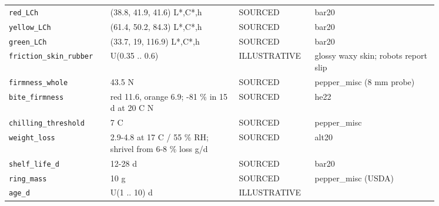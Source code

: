 \documentclass[10.5pt,a4paper]{article}
\begin{document}
{\begin{longtable}{@{}p{0.2\linewidth}p{0.27\linewidth}p{0.12\linewidth}p{0.26\linewidth}@{}}
\texttt{red\_\allowbreak{}LCh} & (38.8, 41.9, 41.6) L*,C*,h & SOURCED & bar20 \\
\texttt{yellow\_\allowbreak{}LCh} & (61.4, 50.2, 84.3) L*,C*,h & SOURCED & bar20 \\
\texttt{green\_\allowbreak{}LCh} & (33.7, 19, 116.9) L*,C*,h & SOURCED & bar20 \\
\texttt{friction\_\allowbreak{}skin\_\allowbreak{}rubber} & U(0.35 .. 0.6) & ILLUSTRATIVE & glossy waxy skin; robots report slip \\
\texttt{firmness\_\allowbreak{}whole} & 43.5 N & SOURCED & pepper\_misc (8 mm probe) \\
\texttt{bite\_\allowbreak{}firmness} & red 11.6, orange 6.9; -81 \% in 15 d at 20 C N & SOURCED & he22 \\
\texttt{chilling\_\allowbreak{}threshold} & 7 C & SOURCED & pepper\_misc \\
\texttt{weight\_\allowbreak{}loss} & 2.9-4.8 at 17 C / 55 \% RH; shrivel from 6-8 \% loss g/d & SOURCED & alt20 \\
\texttt{shelf\_\allowbreak{}life\_\allowbreak{}d} & 12-28 d & SOURCED & bar20 \\
\texttt{ring\_\allowbreak{}mass} & 10 g & SOURCED & pepper\_misc (USDA) \\
\texttt{age\_\allowbreak{}d} & U(1 .. 10) d & ILLUSTRATIVE &  \\\bottomrule\end{longtable}}
\end{document}
